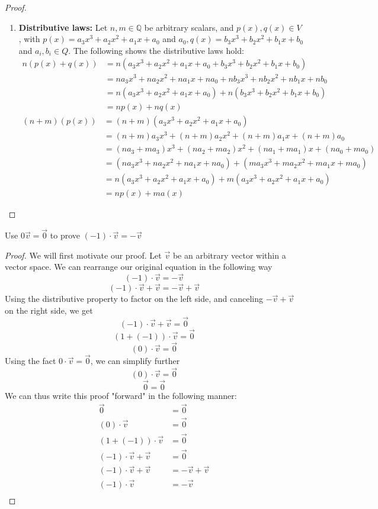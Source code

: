 \documentclass[11pt]{article}
\newcommand{\Q}{\mathbb{Q}}
\begin{document}
\begin{proof}
\begin{enumerate}
\item \textbf{Distributive laws:}  Let $n, m \in \Q$ be arbitrary scalars, and $p(x), q(x) \in V$, with $p(x)=a_3x^3 + a_2x^2 + a_1x + a_0$ and $a_0, q(x)=b_3x^3 + b_2x^2 + b_1x + b_0$ and $a_i, b_i \in Q$. The following shows the distributive laws hold:
\begin{align*}
n(p(x) + q(x))  &= n(a_3x^3 + a_2x^2 + a_1x + a_0 + b_3x^3 + b_2x^2 + b_1x + b_0) \\
                &= na_3x^3 + na_2x^2 + na_1x + na_0 + nb_3x^3 + nb_2x^2 + nb_1x + nb_0 \\
                &= n(a_3x^3 + a_2x^2 + a_1x + a_0) + n(b_3x^3 + b_2x^2 + b_1x + b_0) \\
                &= np(x) + nq(x)
\end{align*}
\begin{align*}
(n+m)(p(x)) &= (n+m)(a_3x^3 + a_2x^2 + a_1x + a_0) \\
                &= (n+m)a_3x^3 + (n+m)a_2x^2 + (n+m)a_1x + (n+m)a_0 \\
                &= (na_3+ma_3)x^3 + (na_2+ma_2)x^2 + (na_1+ma_1)x + (na_0+ma_0) \\
                &= (na_3x^3 + na_2x^2 + na_1x + na_0) + (ma_3x^3 + ma_2x^2 + ma_1x + ma_0) \\
                &= n(a_3x^3 + a_2x^2 + a_1x + a_0) + m(a_3x^3 + a_2x^2 + a_1x + a_0) \\
                &= np(x) + ma(x)
\end{align*}

\end{enumerate}
\end{proof}

\begin{problem}[Problem 2]
    Use $0\vec{v} = \vec{0}$ to prove $(-1)\cdot \vec{v} = -\vec{v}$
\end{problem}
\begin{proof}
We will first motivate our proof. Let $\vec{v}$ be an arbitrary vector within a vector space. We can rearrange our original equation in the following way
$$(-1)\cdot \vec{v} = -\vec{v} $$
$$(-1)\cdot \vec{v} +\vec{v} = -\vec{v}+\vec{v} $$
Using the distributive property to factor on the left side, and canceling $-\vec{v}+\vec{v}$ on the right side, we get
$$(-1)\cdot \vec{v} +\vec{v} = \vec{0} $$
$$(1+(-1))\cdot \vec{v}= \vec{0} $$
$$(0) \cdot \vec{v} = \vec{0}$$
Using the fact $0\cdot \vec{v} = \vec{0}$, we can simplify further
$$(0) \cdot \vec{v} = \vec{0}$$
$$\vec{0} = \vec{0}$$
We can thus write this proof "forward" in the following manner:
\begin{align*}
\vec{0} &= \vec{0} \\
(0) \cdot \vec{v} &= \vec{0} \\
(1+(-1))\cdot \vec{v}&= \vec{0}  \\
(-1)\cdot \vec{v} +\vec{v} &= \vec{0}  \\
(-1)\cdot \vec{v} +\vec{v} &= -\vec{v}+\vec{v}  \\
(-1)\cdot \vec{v} &= -\vec{v}  \\
\end{align*}
\end{proof}
\end{document}
